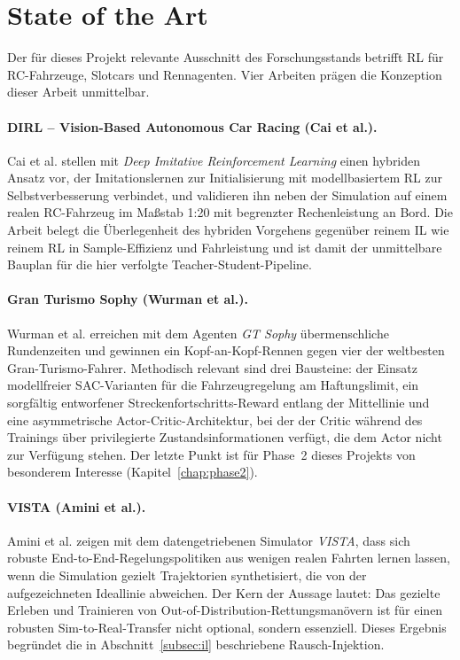 \section{State of the Art}
\label{sec:sota}

Der für dieses Projekt relevante Ausschnitt des Forschungsstands betrifft \ac{RL} für RC-Fahrzeuge, Slotcars und Rennagenten. Vier Arbeiten prägen die Konzeption dieser Arbeit unmittelbar.

\paragraph{DIRL -- Vision-Based Autonomous Car Racing (Cai et al.).}
Cai et al. \cite{cai2021vision} stellen mit \emph{Deep Imitative Reinforcement Learning} einen hybriden Ansatz vor, der Imitationslernen zur Initialisierung mit modellbasiertem \ac{RL} zur Selbstverbesserung verbindet, und validieren ihn neben der Simulation auf einem realen RC-Fahrzeug im Maßstab 1:20 mit begrenzter Rechenleistung an Bord. Die Arbeit belegt die Überlegenheit des hybriden Vorgehens gegenüber reinem \ac{IL} wie reinem \ac{RL} in Sample-Effizienz und Fahrleistung und ist damit der unmittelbare Bauplan für die hier verfolgte Teacher-Student-Pipeline.

\paragraph{Gran Turismo Sophy (Wurman et al.).}
Wurman et al. \cite{wurman2022outracing} erreichen mit dem Agenten \emph{GT Sophy} übermenschliche Rundenzeiten und gewinnen ein Kopf-an-Kopf-Rennen gegen vier der weltbesten Gran-Turismo-Fahrer. Methodisch relevant sind drei Bausteine: der Einsatz modellfreier \ac{SAC}-Varianten für die Fahrzeugregelung am Haftungslimit, ein sorgfältig entworfener Streckenfortschritts-Reward entlang der Mittellinie und eine asymmetrische Actor-Critic-Architektur, bei der der Critic während des Trainings über privilegierte Zustandsinformationen verfügt, die dem Actor nicht zur Verfügung stehen. Der letzte Punkt ist für Phase~2 dieses Projekts von besonderem Interesse (Kapitel~\ref{chap:phase2}).

\paragraph{VISTA (Amini et al.).}
Amini et al. \cite{amini2020learning} zeigen mit dem datengetriebenen Simulator \emph{VISTA}, dass sich robuste End-to-End-Regelungspolitiken aus wenigen realen Fahrten lernen lassen, wenn die Simulation gezielt Trajektorien synthetisiert, die von der aufgezeichneten Ideallinie abweichen. Der Kern der Aussage lautet: Das gezielte Erleben und Trainieren von Out-of-Distribution-Rettungsmanövern ist für einen robusten Sim-to-Real-Transfer nicht optional, sondern essenziell. Dieses Ergebnis begründet die in Abschnitt~\ref{subsec:il} beschriebene Rausch-Injektion.

